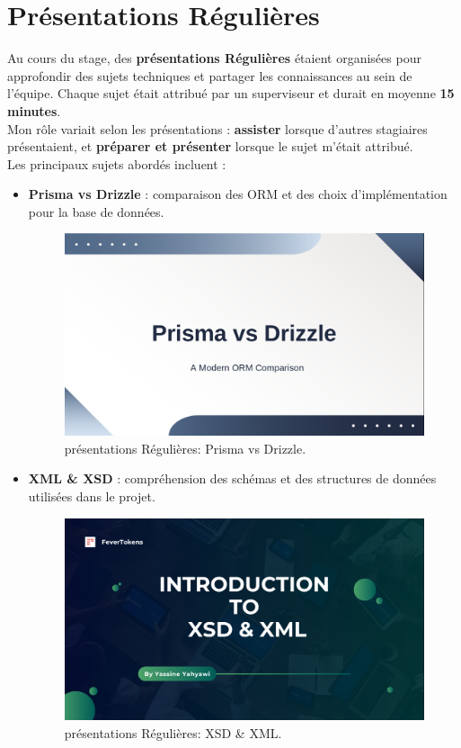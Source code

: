 \section{Présentations Régulières}
Au cours du stage, des \textbf{présentations Régulières} étaient organisées pour approfondir des sujets techniques et partager les connaissances au sein de l'équipe. Chaque sujet était attribué par un superviseur et durait en moyenne \textbf{15 minutes}.\\[1mm]
Mon rôle variait selon les présentations : \textbf{assister} lorsque d'autres stagiaires présentaient, et \textbf{préparer et présenter} lorsque le sujet m'était attribué.\\[5mm]
Les principaux sujets abordés incluent :

\begin{itemize}
    \item \textbf{Prisma vs Drizzle} : comparaison des ORM et des choix d'implémentation pour la base de données.
        \begin{figure}[H]
            \centering
            \includegraphics[width=.5\textwidth]{figures/presentation_1.pdf} 
            \caption{présentations Régulières: Prisma vs Drizzle.}
            \label{fig:weekly_presentations}
        \end{figure}
    \item \textbf{XML \& XSD} : compréhension des schémas et des structures de données utilisées dans le projet.
        \begin{figure}[H]
            \centering
            \includegraphics[width=.5\textwidth]{figures/presentation_2.pdf} 
            \caption{présentations Régulières: XSD \& XML.}
            \label{fig:weekly_presentations}

\end{figure}
\end{itemize}
